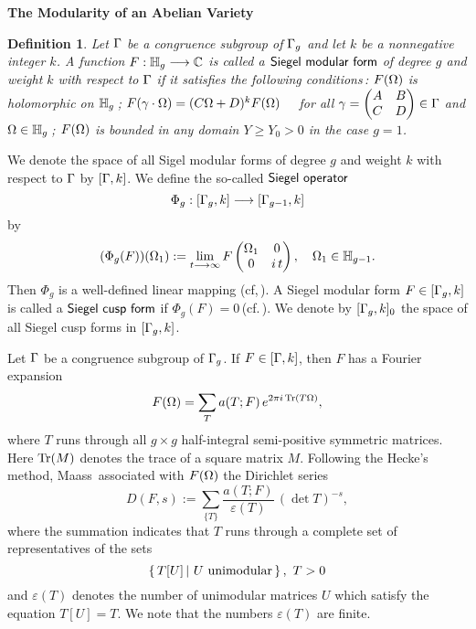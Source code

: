 \documentclass[11pt]{amsart}
\newtheorem{definition}[theorem]{Definition}
\begin{document}
\begin{section}{{\bf The Modularity of an Abelian Variety}}
\begin{definition}\label{def (2.1)}
Let $\Gamma$ be a congruence subgroup of $\Gamma_g$ and let $k$ be a nonnegative integer $k$.
A function $F:\mathbb H_g\longrightarrow \mathbb C$ is called a
$\sf{Siegel\ modular\ form}$ of degree $g$ and weight $k$ with respect to $\Gamma$
if it satisfies the following conditions\,:
\vskip 2mm
{} $F(\Omega)$ is holomorphic on $\mathbb H_g$\,;
\vskip 2mm
{} $F(\gamma\cdot \Omega)=(C\Omega+D)^k F(\Omega)$ \ \ for all
$\gamma=\begin{pmatrix}
      A & B \\
      C & D
     \end{pmatrix}\in \Gamma$ and $\Omega\in \mathbb H_g$\,;
\vskip 2mm
{} $F(\Omega)$ is bounded in any domain $Y\geq Y_0 > 0$ in the case $g=1$.
\end{definition}
We denote the space of all Sigel modular forms of degree $g$ and weight $k$
with respect to $\Gamma$ by $[\Gamma,k]$.
\vskip 2mm
We define the so-called $\sf{Siegel\ operator}$
\begin{equation*}
  \Phi_g: [\Gamma_g,k]\longrightarrow [\Gamma_{g-1},k]
\end{equation*}
by
\begin{equation*}
  (\Phi_g(F))(\Omega_1):=\lim_{t\longrightarrow\infty}
  F  \begin{pmatrix}
      \Omega_1 & 0 \\
      0 & i\,t
     \end{pmatrix},\quad \Omega_1\in \mathbb H_{g-1}.
\end{equation*}
Then $\Phi_g$ is a well-defined linear mapping (cf,\,\cite[pp.\,187--189]{M}).
A Siegel modular form $F\in [\Gamma_g,k]$ is called a $\sf{Siegel\ cusp\ form}$ if
$\Phi_g(F)=0$\,(cf.\,\cite[p.\,198]{M}). We denote by $[\Gamma_g,k]_0$
the space of all Siegel cusp forms in $[\Gamma_g,k]$.

\vskip 3mm
Let $\Gamma$ be a congruence subgroup of $\Gamma_g$. If $F\in [\Gamma,k]$, then $F$ has
a Fourier expansion
\begin{equation*}
  F(\Omega)=\sum_{T} a(T;F)\,e^{2\pi i\,{\rm Tr}(T\Omega)},
\end{equation*}
where $T$ runs through all $g\times g$ half-integral semi-positive symmetric matrices.
Here ${\rm Tr}(M)$ denotes the trace of a square matrix $M$.
Following the Hecke's method, Maass\,\cite[pp.\,202--210]{M} associated with
$F(\Omega)$ the Dirichlet series
\begin{equation*}
D(F,s):=\sum_{\{ T \}}\frac{a(T;F)}{\varepsilon (T)}\,(\det T)^{-s},
\end{equation*}
where the summation indicates that $T$ runs through a complete set of representatives
of the sets
$$
\left\{ \, T[U]\,|\ U \ \rm{unimodular}\,\right\}, \ T>0
$$
and $\varepsilon (T)$ denotes the number of unimodular matrices $U$ which satisfy
the equation $T[U]=T.$ We note that the numbers $\varepsilon (T)$ are finite.


\end{section}
\end{document}
